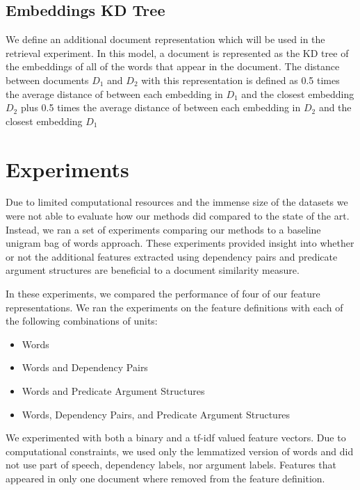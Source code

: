 \documentclass[11pt]{article}
\begin{document}
\subsection{Embeddings KD Tree}

We define an additional document representation which will be used in the retrieval experiment. In this model, a document is represented as the KD tree of the embeddings of all of the words that appear in the document. The distance between documents $D_1$ and $D_2$ with this representation is defined as 0.5 times the average distance of between each embedding in $D_1$  and the closest embedding $D_2$ plus 0.5 times the average distance of between each embedding in $D_2$  and the closest embedding $D_1$


\section{Experiments}

\newcommand{\headcol}{\rowcolor{tableheadcolor}} %



Due to limited computational resources and the immense size of the datasets we were not able to evaluate how our methods did compared to the state of the art. Instead, we ran a set of experiments comparing our methods to a baseline unigram bag of words approach. These experiments provided insight into whether or not the additional features extracted using dependency pairs and predicate argument structures are beneficial to a document similarity measure. 

In these experiments, we compared the performance of four of our feature representations. We ran the experiments on the feature definitions with each of the following combinations of units:

\begin{itemize}
\item Words
\item Words and Dependency Pairs 
\item Words and Predicate Argument Structures
\item Words, Dependency Pairs, and Predicate Argument Structures
\end{itemize}

We experimented with both a binary and a tf-idf valued feature vectors. Due to computational constraints, we used only the lemmatized version of words and did not use part of speech, dependency labels, nor argument labels. Features that appeared in only one document where removed from the feature definition.
\end{document}
